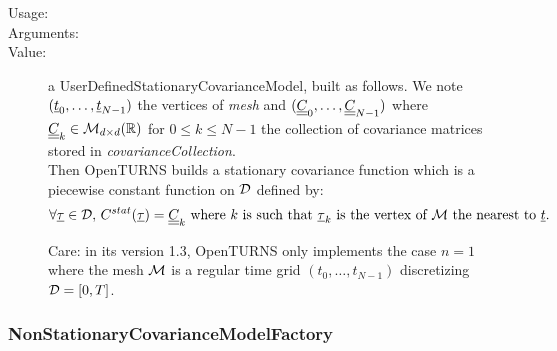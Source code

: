 \begin{description}

\item[Usage:] \rule{0pt}{1em}
\bigskip

\item[Arguments:]  \rule{0pt}{1em}
\bigskip

\item[Value:] a UserDefinedStationaryCovarianceModel, built as follows.
We note $({\underline{t}}_0,\dots, {\underline{t}}_{N-1})$ the vertices of \textit{mesh} and $({\underline{\underline{C}}}_0, \dots, {\underline{\underline{C}}}_{N-1})$ where ${\underline{\underline{C}}}_k \in \mathcal{M}_{d \times d}({\mathbb R})$ for $0 \leq k \leq N-1$ the collection of covariance matrices stored in \textit{covarianceCollection}.\\

Then OpenTURNS builds a stationary covariance function which is a piecewise constant function on ${\mathcal D}$ defined by:
\begin{align*}
\forall {\underline{\tau}} \in {\mathcal D}, \, C^{stat}({\underline{\tau}}) =  {\underline{\underline{C}}}_k \mbox{ where } k \mbox{ is such that } {\underline{\tau}}_k \mbox{ is the  vertex of } {\mathcal M}  \mbox{ the nearest to } {\underline{t}}.
\end{align*}

Care: in its version 1.3, OpenTURNS only implements the case $n=1$ where the mesh
${\mathcal M}$ is a regular time grid $(t_0, \dots, t_{N-1})$ discretizing ${\mathcal D}=[0,T]$.


\end{description}


\subsubsection{NonStationaryCovarianceModelFactory}

